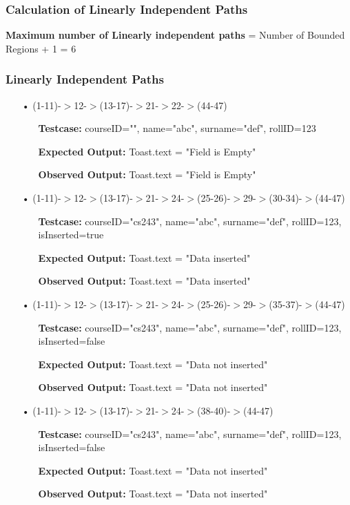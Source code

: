 \documentclass{scrreprt}
\begin{document}
\newpage


\subsubsection{Calculation of Linearly Independent Paths}
\textbf{Maximum number of Linearly independent paths} = Number of Bounded Regions + 1 = 6
\subsubsection{Linearly Independent Paths}
\begin{enumerate}
\item[•](1-11)-$>$12-$>$(13-17)-$>$21-$>$22-$>$(44-47)
\begin{itemize}
\item[]\textbf{Testcase: }courseID="", name="abc", surname="def", rollID=123
\item[]\textbf{Expected Output: }Toast.text = "Field is Empty"
\item[]\textbf{Observed Output: }Toast.text = "Field is Empty"
\end{itemize}

\item[•](1-11)-$>$12-$>$(13-17)-$>$21-$>$24-$>$(25-26)-$>$29-$>$(30-34)-$>$(44-47)
\begin{itemize}
\item[]\textbf{Testcase: }courseID="cs243", name="abc", surname="def", rollID=123, isInserted=true
\item[]\textbf{Expected Output: }Toast.text = "Data inserted"
\item[]\textbf{Observed Output: }Toast.text = "Data inserted"
\end{itemize}

\item[•](1-11)-$>$12-$>$(13-17)-$>$21-$>$24-$>$(25-26)-$>$29-$>$(35-37)-$>$(44-47)
\begin{itemize}
\item[]\textbf{Testcase: }courseID="cs243", name="abc", surname="def", rollID=123, isInserted=false
\item[]\textbf{Expected Output: }Toast.text = "Data not inserted"
\item[]\textbf{Observed Output: }Toast.text = "Data not inserted"
\end{itemize}

\item[•](1-11)-$>$12-$>$(13-17)-$>$21-$>$24-$>$(38-40)-$>$(44-47)
\begin{itemize}
\item[]\textbf{Testcase: }courseID="cs243", name="abc", surname="def", rollID=123, isInserted=false
\item[]\textbf{Expected Output: }Toast.text = "Data not inserted"
\item[]\textbf{Observed Output: }Toast.text = "Data not inserted"
\end{itemize}


\end{enumerate}
\end{document}
